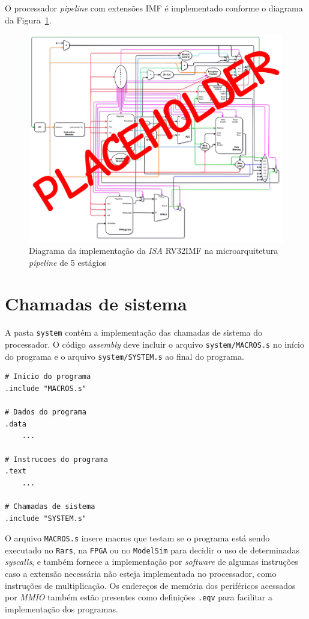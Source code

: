         { O processador \textit{pipeline} com extensões IMF é implementado conforme
            o diagrama da Figura~\ref{fig:diagram_rv32imf_pipe}.
        }

        \begin{figure}[H]
        \centering
            \includegraphics[width=.9\linewidth]{../images/uarch_diagrams/pipeline-RV32IMF.png}
            \caption{Diagrama da implementação da \textit{ISA} RV32IMF na
            microarquitetura \textit{pipeline} de 5 estágios}\label{fig:diagram_rv32imf_pipe}
        \end{figure}


\clearpage
\section{Chamadas de sistema}
    { A pasta \texttt{system} contém a implementação das chamadas de sistema do
        processador. O código \textit{assembly} deve incluir o arquivo
        \texttt{system/MACROS.s} no início do programa e o arquivo
        \texttt{system/SYSTEM.s} ao final do programa.
    }
    \begin{lstlisting}
# Inicio do programa
.include "MACROS.s"

# Dados do programa
.data
    ...

# Instrucoes do programa
.text
    ...

# Chamadas de sistema
.include "SYSTEM.s"
    \end{lstlisting}

    { O arquivo \texttt{MACROS.s} insere macros que testam se o programa
        está sendo executado no \texttt{Rars}, na \texttt{FPGA} ou no
        \texttt{ModelSim} para decidir o uso de determinadas \textit{syscalls},
        e também fornece a implementação por \textit{software} de algumas
        instruções caso a extensão necessária não esteja implementada no processador,
        como instruções de multiplicação. Os endereços de memória dos periféricos
        acessados por \textit{MMIO} também estão presentes como definições
        \texttt{.eqv} para facilitar a implementação dos programas.
    }

